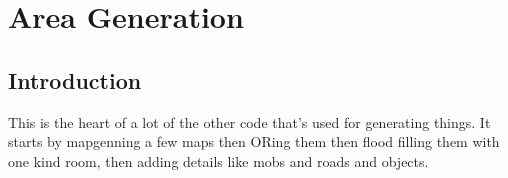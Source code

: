 \chapter{Area Generation}

\section{Introduction}

This is the heart of a lot of the other code that's used for generating
things. It starts by mapgenning a few maps then ORing them then flood
filling them with one kind room, then adding details like mobs and
roads and objects.

